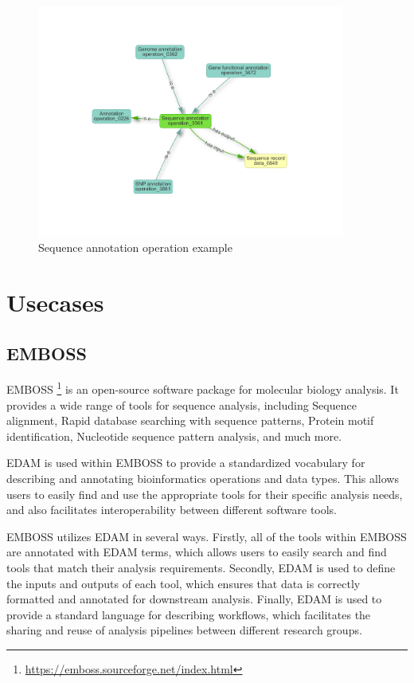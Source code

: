 \documentclass{scrartcl}
\begin{document}
\begin{figure}[h!]
  \centering
  \includegraphics[width=0.9\textwidth]{imgs/sequence-annotation.png}
  \caption{Sequence annotation operation example}
  \label{fig:graph}
\end{figure}



\newpage
\section{Usecases}

\subsection{EMBOSS}
EMBOSS \footnote{\url{https://emboss.sourceforge.net/index.html}} is an open-source software package 
  for molecular biology analysis. It provides a wide range of tools for sequence analysis, 
  including Sequence alignment, Rapid database searching with sequence patterns, 
  Protein motif identification, Nucleotide sequence pattern analysis, and much more.

EDAM is used within EMBOSS to provide a standardized vocabulary for describing and annotating 
  bioinformatics operations and data types. 
  This allows users to easily find and use the appropriate tools for their specific analysis needs, 
  and also facilitates interoperability between different software tools.

EMBOSS utilizes EDAM in several ways. Firstly, all of the tools within EMBOSS are annotated with EDAM terms, 
  which allows users to easily search and find tools that match their analysis requirements. 
  Secondly, EDAM is used to define the inputs and outputs of each tool, which ensures that data is correctly 
  formatted and annotated for downstream analysis. Finally, EDAM is used to provide a standard language for 
  describing workflows, which facilitates the sharing and reuse of analysis pipelines between 
  different research groups.
\end{document}
